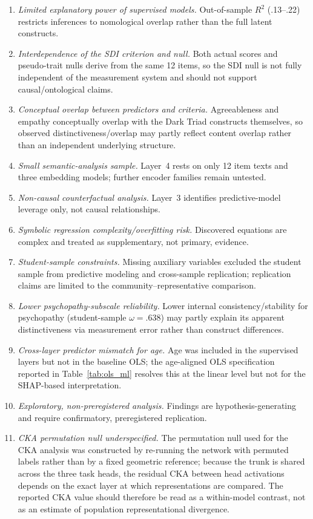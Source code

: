 \documentclass[11pt,twocolumn]{article}
\begin{document}
\begin{enumerate}[leftmargin=1.2em,itemsep=0pt,topsep=2pt]
\item \textit{Limited explanatory power of supervised models.} Out-of-sample $R^2$ (.13--.22) restricts inferences to nomological overlap rather than the full latent constructs.
\item \textit{Interdependence of the SDI criterion and null.} Both actual scores and pseudo-trait nulls derive from the same 12 items, so the SDI null is not fully independent of the measurement system and should not support causal/ontological claims.
\item \textit{Conceptual overlap between predictors and criteria.} Agreeableness and empathy conceptually overlap with the Dark Triad constructs themselves, so observed distinctiveness/overlap may partly reflect content overlap rather than an independent underlying structure.
\item \textit{Small semantic-analysis sample.} Layer~4 rests on only 12 item texts and three embedding models; further encoder families remain untested.
\item \textit{Non-causal counterfactual analysis.} Layer~3 identifies predictive-model leverage only, not causal relationships.
\item \textit{Symbolic regression complexity/overfitting risk.} Discovered equations are complex and treated as supplementary, not primary, evidence.
\item \textit{Student-sample constraints.} Missing auxiliary variables excluded the student sample from predictive modeling and cross-sample replication; replication claims are limited to the community--representative comparison.
\item \textit{Lower psychopathy-subscale reliability.} Lower internal consistency/stability for psychopathy (student-sample $\omega = .638$) may partly explain its apparent distinctiveness via measurement error rather than construct differences.
\item \textit{Cross-layer predictor mismatch for age.} Age was included in the supervised layers but not in the baseline OLS; the age-aligned OLS specification reported in Table~\ref{tab:ols_ml} resolves this at the linear level but not for the SHAP-based interpretation.
\item \textit{Exploratory, non-preregistered analysis.} Findings are hypothesis-generating and require confirmatory, preregistered replication.
\item \textit{CKA permutation null underspecified.} The permutation null used for the CKA analysis was constructed by re-running the network with permuted labels rather than by a fixed geometric reference; because the trunk is shared across the three task heads, the residual CKA between head activations depends on the exact layer at which representations are compared. The reported CKA value should therefore be read as a within-model contrast, not as an estimate of population representational divergence.

\end{enumerate}
\end{document}
